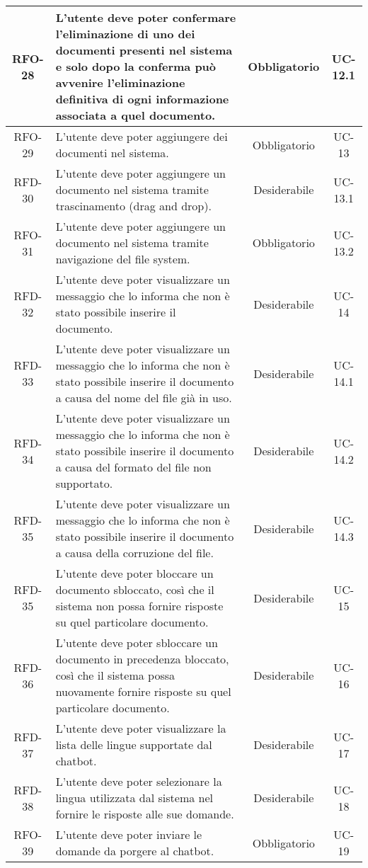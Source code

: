 \begin{xltabular}{\textwidth}{| c | X | c | c |}
    \hline
    RFO-28 & L’utente deve poter confermare l’eliminazione di uno dei documenti presenti nel sistema e solo dopo la conferma può avvenire l'eliminazione definitiva di ogni informazione associata a quel documento. & Obbligatorio & UC-12.1 \\
    \hline
    RFO-29 & L’utente deve poter aggiungere dei documenti nel sistema. & Obbligatorio & UC-13 \\
    \hline
    RFD-30 & L’utente deve poter aggiungere un documento nel sistema tramite trascinamento (drag and drop). & Desiderabile & UC-13.1 \\
    \hline
    RFO-31 & L’utente deve poter aggiungere un documento nel sistema tramite navigazione del file system. & Obbligatorio & UC-13.2 \\
    \hline
    RFD-32 & L'utente deve poter visualizzare un messaggio che lo informa che non è stato possibile inserire il documento. & Desiderabile  & UC-14 \\
    \hline
    RFD-33 & L'utente deve poter visualizzare un messaggio che lo informa che non è stato possibile inserire il documento a causa del nome del file già in uso. & Desiderabile & UC-14.1 \\
    \hline
    RFD-34 & L'utente deve poter visualizzare un messaggio che lo informa che non è stato possibile inserire il documento a causa del formato del file non supportato. & Desiderabile & UC-14.2 \\
    \hline
    RFD-35 & L'utente deve poter visualizzare un messaggio che lo informa che non è stato possibile inserire il documento a causa della corruzione del file. & Desiderabile & UC-14.3 \\
    \hline
    RFD-35 & L’utente deve poter bloccare un documento sbloccato, così che il sistema non possa fornire risposte su quel particolare documento. & Desiderabile & UC-15 \\
    \hline
    RFD-36 & L’utente deve poter sbloccare un documento in precedenza bloccato, così che il sistema possa nuovamente fornire risposte su quel particolare documento. & Desiderabile & UC-16 \\
    \hline
    RFD-37 & L’utente deve poter visualizzare la lista delle lingue supportate dal chatbot. & Desiderabile & UC-17 \\
    \hline
    RFD-38 & L’utente deve poter selezionare la lingua utilizzata dal sistema nel fornire le risposte alle sue domande. & Desiderabile & UC-18 \\
    \hline
    RFO-39 & L’utente deve poter inviare le domande da porgere al chatbot. & Obbligatorio & UC-19 \\

\end{xltabular}
